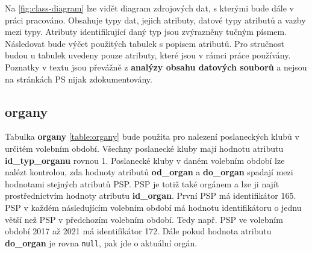 Na \ref{fig:class-diagram} lze vidět diagram zdrojových dat, s kterými bude dále v práci pracováno. Obsahuje typy dat, jejich atributy, datové typy atributů a vazby mezi typy. Atributy identifikující daný typ jsou zvýrazněny tučným písmem. Následovat bude výčet použitých tabulek s popisem atributů. Pro stručnost budou u tabulek uvedeny pouze atributy, které jsou v rámci práce používány. Poznatky v textu jsou převážně z \textbf{analýzy obsahu datových souborů} a nejsou na stránkách PS nijak zdokumentovány.

\subsection*{organy}
Tabulka \textbf{organy} \ref{table:organy} bude použita pro nalezení poslaneckých klubů v určitém volebním období. Všechny poslanecké kluby mají hodnotu atributu \textbf{id\_typ\_organu} rovnou 1. Poslanecké kluby v daném volebním období lze nalézt kontrolou, zda hodnoty atributů \textbf{od\_organ} a \textbf{do\_organ} spadají mezi hodnotami stejných atributů PSP. PSP je totiž také orgánem a lze ji najít prostřednictvím hodnoty atributu \textbf{id\_organ}. První PSP má identifikátor 165. PSP v každém následujícím volebním období má hodnotu identifikátoru o jednu větší než PSP v předchozím volebním období. Tedy např. PSP ve volebním období 2017 až 2021 má identifikátor 172. Dále pokud hodnota atributu \textbf{do\_organ} je rovna \lstinline|null|, pak jde o aktuální orgán.

